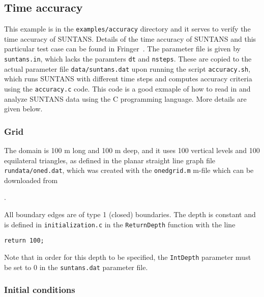 \subsection{Time accuracy} \label{sec:timeaccuracy}

This example is in the \verb+examples/accuracy+ directory and it
serves to verify the time accuracy of SUNTANS.  Details of the time accuracy
of SUNTANS and this particular test case can be found in Fringer\etal~\cite{FRINGER[2005]}.
The parameter file is given by
\verb+suntans.in+, which lacks the paramters \verb+dt+ and \verb+nsteps+.  These
are copied to the actual parameter file \verb+data/suntans.dat+ upon running the
script \verb+accuracy.sh+, which runs SUNTANS with different time steps and computes
accuracy criteria using the \verb+accuracy.c+ code.  This code is a good exmaple
of how to read in and analyze SUNTANS data using the C programming language.  More
details are given below.

\subsubsection{Grid}

The domain is 100 m long and 100 m deep, and it
uses 100 vertical levels and 100 equilateral triangles, as defined in the planar
straight line graph file \verb+rundata/oned.dat+, which was created with the
\verb+onedgrid.m+ m-file which can be downloaded from 

\medskip
\noindent
\mfiledownload.

\medskip
\noindent
All boundary edges are of type 1 (closed) boundaries.
The depth is constant and is defined in \verb+initialization.c+ in the 
\verb+ReturnDepth+ function with the line
\begin{verbatim}
return 100;
\end{verbatim}
Note that in order for this depth to be specified, the \verb+IntDepth+ parameter must
be set to 0 in the \verb+suntans.dat+ parameter file.

\subsubsection{Initial conditions}

